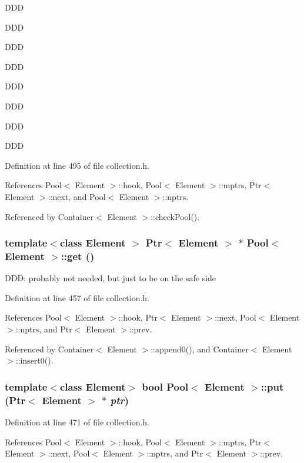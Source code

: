 DDD

DDD

DDD

DDD

DDD

DDD

DDD

DDD 

Definition at line 495 of file collection.h.

References Pool$<$ Element $>$::hook, Pool$<$ Element $>$::mptrs, Ptr$<$ Element $>$::next, and Pool$<$ Element $>$::nptrs.

Referenced by Container$<$ Element $>$::checkPool().\hypertarget{structPool_46e44058b21fbfd2c6f613739993439b}{
\subsubsection[{get}]{\setlength{\rightskip}{0pt plus 5cm}template$<$class Element $>$ {\bf Ptr}$<$ Element $>$ $\ast$ {\bf Pool}$<$ Element $>$::get ()}}
\label{structPool_46e44058b21fbfd2c6f613739993439b}




DDD: probably not needed, but just to be on the safe side 

Definition at line 457 of file collection.h.

References Pool$<$ Element $>$::hook, Ptr$<$ Element $>$::next, Pool$<$ Element $>$::nptrs, and Ptr$<$ Element $>$::prev.

Referenced by Container$<$ Element $>$::append0(), and Container$<$ Element $>$::insert0().\hypertarget{structPool_4c8f2bd60ea783e997286b8cc39d3e4f}{
\subsubsection[{put}]{\setlength{\rightskip}{0pt plus 5cm}template$<$class Element$>$ bool {\bf Pool}$<$ Element $>$::put ({\bf Ptr}$<$ Element $>$ $\ast$ {\em ptr})}}
\label{structPool_4c8f2bd60ea783e997286b8cc39d3e4f}




Definition at line 471 of file collection.h.

References Pool$<$ Element $>$::hook, Pool$<$ Element $>$::mptrs, Ptr$<$ Element $>$::next, Pool$<$ Element $>$::nptrs, and Ptr$<$ Element $>$::prev.


